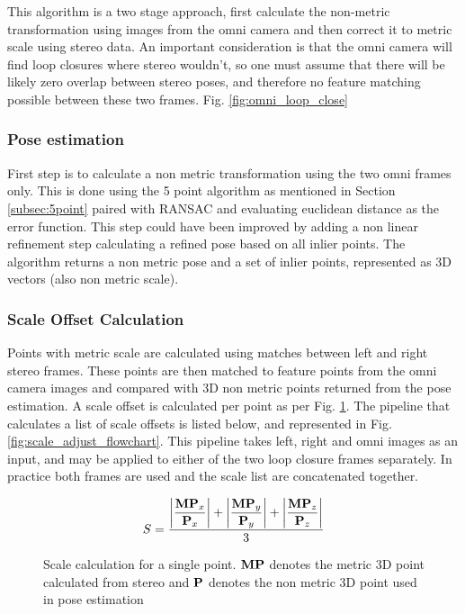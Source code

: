 This algorithm is a two stage approach, first calculate the non-metric transformation using images from the omni camera and then correct it to metric scale using stereo data.  An important consideration is that the omni camera will find loop closures where stereo wouldn't, so one must assume that there will be likely zero overlap between stereo poses, and therefore no feature matching possible between these two frames. Fig. \ref{fig:omni_loop_close}

\subsubsection{Pose estimation}

First step is to calculate a non metric transformation using the two omni frames only.  This is done using the 5 point algorithm as mentioned in Section \ref{subsec:5point} paired with RANSAC and evaluating euclidean distance as the error function.  This step could have been improved by adding a non linear refinement step calculating a refined pose based on all inlier points.  The algorithm returns a non metric pose and a set of inlier points, represented as 3D vectors (also non metric scale).

\subsubsection{Scale Offset Calculation}

Points with metric scale are calculated using matches between left and right stereo frames.  These points are then matched to feature points from the omni camera images and compared with 3D non metric points returned from the pose estimation.  A scale offset is calculated per point as per Fig. \ref{fig:scale_offset}.  The pipeline that calculates a list of scale offsets is listed below, and represented in Fig. \ref{fig:scale_adjust_flowchart}.  This pipeline takes left, right and omni images as an input, and may be applied to either of the two loop closure frames separately.  In practice both frames are used and the scale list are concatenated together.

\begin{figure}[h]
  \centering
  \begin{align}
   S =
   \displaystyle\frac{
   \left|\displaystyle\frac{\mathbf {MP}_{x}}{\mathbf P_{x}}\right| + 
   \left|\displaystyle\frac{\mathbf {MP}_{y}}{\mathbf P_{y}}\right| + 
   \left|\displaystyle\frac{\mathbf {MP}_{z}}{\mathbf P_{z}}\right|
   }
   {3}
  \end{align}
  \caption{Scale calculation for a single point.  $\mathbf{MP}$ denotes the metric 3D point calculated from stereo and $\mathbf{P}$ denotes the non metric 3D point used in pose estimation}
  \label{fig:scale_offset}
\end{figure}

